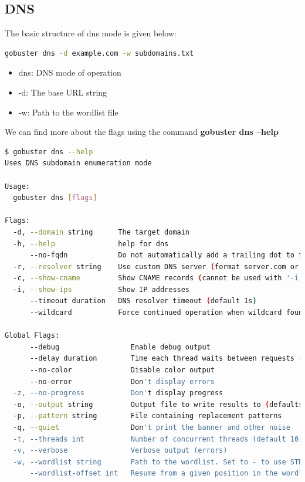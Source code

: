 \documentclass[12 pt]{article}
\begin{document}
\subsection{DNS}
The basic structure of dns mode is given below:
\begin{lstlisting}[language=bash]
gobuster dns -d example.com -w subdomains.txt
\end{lstlisting}
\begin{itemize}
    \item dns: DNS mode of operation
    \item -d: The base URL string
    \item -w: Path to the wordlist file 
\end{itemize}
We can find more about the flags using the command \textbf{gobuster dns --help}
\begin{lstlisting}[language=bash]
$ gobuster dns --help
Uses DNS subdomain enumeration mode

Usage:
  gobuster dns [flags]

Flags:
  -d, --domain string      The target domain
  -h, --help               help for dns
      --no-fqdn            Do not automatically add a trailing dot to the domain, so the resolver uses the DNS search domain
  -r, --resolver string    Use custom DNS server (format server.com or server.com:port)
  -c, --show-cname         Show CNAME records (cannot be used with '-i' option)
  -i, --show-ips           Show IP addresses
      --timeout duration   DNS resolver timeout (default 1s)
      --wildcard           Force continued operation when wildcard found

Global Flags:
      --debug                 Enable debug output
      --delay duration        Time each thread waits between requests (e.g. 1500ms)
      --no-color              Disable color output
      --no-error              Don't display errors
  -z, --no-progress           Don't display progress
  -o, --output string         Output file to write results to (defaults to stdout)
  -p, --pattern string        File containing replacement patterns
  -q, --quiet                 Don't print the banner and other noise
  -t, --threads int           Number of concurrent threads (default 10)
  -v, --verbose               Verbose output (errors)
  -w, --wordlist string       Path to the wordlist. Set to - to use STDIN.
      --wordlist-offset int   Resume from a given position in the wordlist (defaults to 0)
\end{lstlisting}
\end{document}
